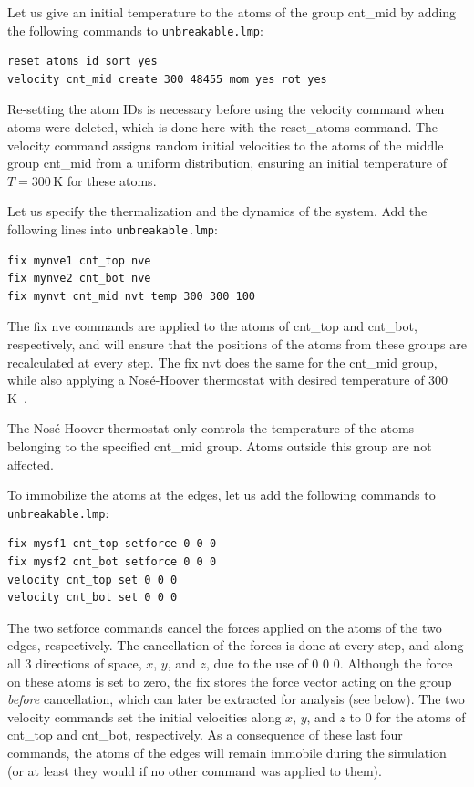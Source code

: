 \documentclass[9pt,tutorial]{livecoms}
\newcommand{\lmpcmd}[1]{\colorbox{listing}{\textcolor{command}{\small{#1}}}} %
\newcommand{\flecmd}[1]{\textcolor{command}{\texttt{#1}}} %
\begin{document}
Let us give an initial temperature to the atoms of the group \lmpcmd{cnt\_mid}
by adding the following commands to \flecmd{unbreakable.lmp}:
\begin{lstlisting}
reset_atoms id sort yes
velocity cnt_mid create 300 48455 mom yes rot yes
\end{lstlisting}
Re-setting the atom IDs is necessary before using the \lmpcmd{velocity} command
when atoms were deleted, which is done here with the \lmpcmd{reset\_atoms} command.
The \lmpcmd{velocity} command {\color{blue}assigns random} initial velocities to the atoms of the middle
group \lmpcmd{cnt\_mid} {\color{blue} from a uniform distribution}, ensuring an initial temperature of $T = 300\,\text{K}$
for these atoms.

Let us specify the thermalization and the dynamics of the system.  Add the following
lines into \flecmd{unbreakable.lmp}:
\begin{lstlisting}
fix mynve1 cnt_top nve
fix mynve2 cnt_bot nve
fix mynvt cnt_mid nvt temp 300 300 100
\end{lstlisting}
The \lmpcmd{fix nve} commands are applied to the atoms of \lmpcmd{cnt\_top} and
\lmpcmd{cnt\_bot}, respectively, and will ensure that the positions of the atoms
from these groups are recalculated at every step.  The \lmpcmd{fix nvt} does the
same for the \lmpcmd{cnt\_mid} group, while also applying a Nos\'e-Hoover thermostat
with desired temperature of 300\,K~\cite{nose1984unified, hoover1985canonical}.

\begin{note}
{\color{blue}The Nosé-Hoover thermostat only controls the temperature of
the atoms belonging to the specified \lmpcmd{cnt\_mid} group. Atoms outside
this group are not affected.}
\end{note}

To {\color{blue}immobilize} the atoms at the edges, let us add the following
commands to \flecmd{unbreakable.lmp}:
\begin{lstlisting}
fix mysf1 cnt_top setforce 0 0 0
fix mysf2 cnt_bot setforce 0 0 0
velocity cnt_top set 0 0 0
velocity cnt_bot set 0 0 0
\end{lstlisting}
The two \lmpcmd{setforce} commands cancel the forces applied on the atoms of the
two edges, respectively.  The cancellation of the forces is done at every step,
and along all 3 directions of space, $x$, $y$, and $z$, due to the use of
\lmpcmd{0 0 0}.  {\color{blue}Although the force on these atoms is set to zero,
the \lmpcmd{fix} stores the force vector acting on the group \emph{before}
cancellation, which can later be extracted for analysis (see below).}
The two \lmpcmd{velocity} commands set the initial velocities
along $x$, $y$, and $z$ to 0 for the atoms of \lmpcmd{cnt\_top} and
\lmpcmd{cnt\_bot}, respectively.  As a consequence of these last four commands,
the atoms of the edges will remain immobile during the simulation (or at least
they would if no other command was applied to them).
\end{document}
